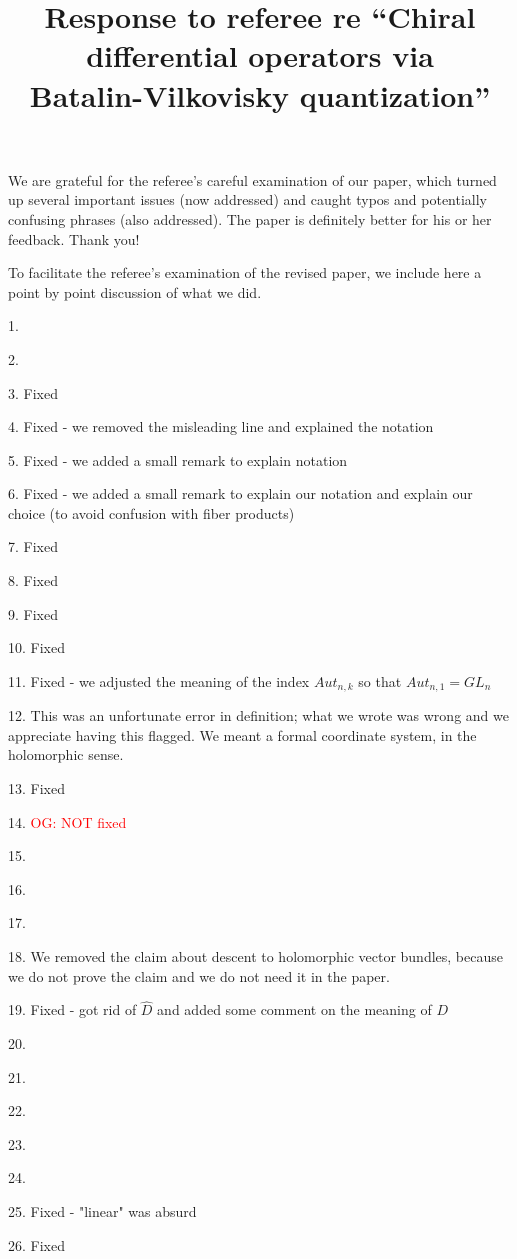 \documentclass[10pt]{amsart}
\title{Response to referee re ``Chiral differential operators via\\Batalin-Vilkovisky quantization''}
\def\owen{\textcolor{red}{OG: }\textcolor{red}}
\begin{document}
\maketitle

We are grateful for the referee's careful examination of our paper, which turned up several important issues (now addressed) and caught typos and potentially confusing phrases (also addressed).
The paper is definitely better for his or her feedback.
Thank you!

To facilitate the referee's examination of the revised paper, 
we include here a point by point discussion of what we did.

1.

2.

3. Fixed

4. Fixed - we removed the misleading line and explained the notation

5. Fixed - we added a small remark to explain notation

6. Fixed - we added a small remark to explain our notation and explain our choice (to avoid confusion with fiber products)

7. Fixed

8. Fixed

9. Fixed

10. Fixed

11. Fixed - we adjusted the meaning of the index $Aut_{n,k}$ so that $Aut_{n,1} = GL_n$

12. This was an unfortunate error in definition; what we wrote was wrong and we appreciate having this flagged. We meant a formal coordinate system, in the holomorphic sense. 

13. Fixed

14. \owen{NOT fixed}

15.

16.

17.

18. We removed the claim about descent to holomorphic vector bundles, because we do not prove the claim and we do not need it in the paper.

19. Fixed - got rid of $\hat{D}$ and added some comment on the meaning of $D$

20. 

21.

22.

23.

24.

25. Fixed - "linear" was absurd

26. Fixed
\end{document}
